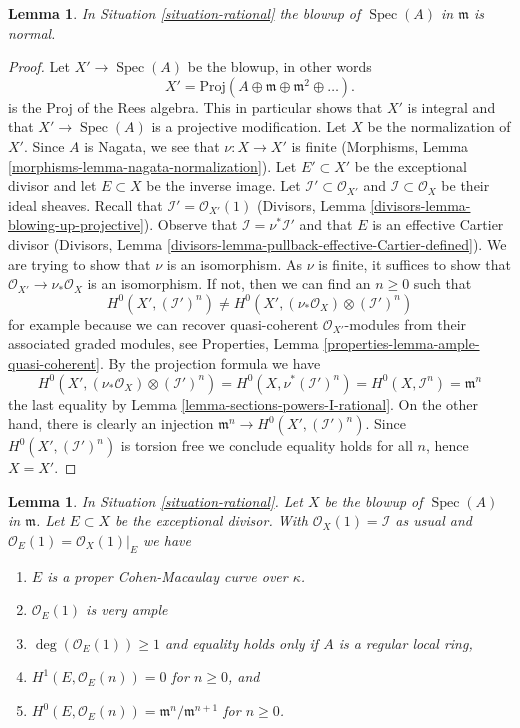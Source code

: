 \documentclass{stacks-project}
\theoremstyle{plain}
\newtheorem{lemma}[subsection]{Lemma}
\theoremstyle{definition}
\theoremstyle{remark}
\numberwithin{equation}{subsection}
\def\Spec{\mathop{\mathrm{Spec}}}
\begin{document}
\begin{lemma}
\label{lemma-blow-up-normal-rational}
In Situation \ref{situation-rational}
the blowup of $\Spec(A)$ in $\mathfrak m$ is normal.
\end{lemma}

\begin{proof}
Let $X' \to \Spec(A)$ be the blowup, in other words
$$
X' = \text{Proj}(A \oplus \mathfrak m \oplus \mathfrak m^2 \oplus \ldots).
$$
is the Proj of the Rees algebra. This in particular shows that
$X'$ is integral and that $X' \to \Spec(A)$ is a projective
modification. Let $X$ be the normalization of $X'$.
Since $A$ is Nagata, we see that $\nu : X \to X'$ is finite
(Morphisms, Lemma \ref{morphisms-lemma-nagata-normalization}).
Let $E' \subset X'$ be the exceptional divisor and let $E \subset X$
be the inverse image. Let $\mathcal{I}' \subset \mathcal{O}_{X'}$
and $\mathcal{I} \subset \mathcal{O}_X$ be their ideal sheaves.
Recall that $\mathcal{I}' = \mathcal{O}_{X'}(1)$
(Divisors, Lemma \ref{divisors-lemma-blowing-up-projective}).
Observe that $\mathcal{I} = \nu^*\mathcal{I}'$ and that $E$ is an
effective Cartier divisor (Divisors, Lemma
\ref{divisors-lemma-pullback-effective-Cartier-defined}).
We are trying to show that $\nu$ is an isomorphism. As $\nu$ is finite,
it suffices to show that $\mathcal{O}_{X'} \to \nu_*\mathcal{O}_X$
is an isomorphism. If not, then we can find an $n \geq 0$ such that
$$
H^0(X', (\mathcal{I}')^n) \not =
H^0(X', (\nu_*\mathcal{O}_X) \otimes (\mathcal{I}')^n)
$$
for example because we can recover quasi-coherent $\mathcal{O}_{X'}$-modules
from their associated graded modules, see
Properties, Lemma \ref{properties-lemma-ample-quasi-coherent}.
By the projection formula we have
$$
H^0(X', (\nu_*\mathcal{O}_X) \otimes (\mathcal{I}')^n) =
H^0(X, \nu^*(\mathcal{I}')^n) =
H^0(X, \mathcal{I}^n) = \mathfrak m^n
$$
the last equality by Lemma \ref{lemma-sections-powers-I-rational}.
On the other hand, there is clearly an injection
$\mathfrak m^n \to H^0(X', (\mathcal{I}')^n)$. Since
$H^0(X', (\mathcal{I}')^n)$ is torsion free we conclude equality holds
for all $n$, hence $X = X'$.
\end{proof}

\begin{lemma}
\label{lemma-cohomology-blow-up-rational}
In Situation \ref{situation-rational}.
Let $X$ be the blowup of $\Spec(A)$ in $\mathfrak m$. Let $E \subset X$
be the exceptional divisor. With $\mathcal{O}_X(1) = \mathcal{I}$ as
usual and $\mathcal{O}_E(1) = \mathcal{O}_X(1)|_E$ we have
\begin{enumerate}
\item $E$ is a proper Cohen-Macaulay curve over $\kappa$.
\item $\mathcal{O}_E(1)$ is very ample
\item $\deg(\mathcal{O}_E(1)) \geq 1$ and equality holds only if
$A$ is a regular local ring,
\item $H^1(E, \mathcal{O}_E(n)) = 0$ for $n \geq 0$, and
\item $H^0(E, \mathcal{O}_E(n)) = \mathfrak m^n/\mathfrak m^{n + 1}$
for $n \geq 0$.
\end{enumerate}
\end{lemma}
\end{document}
